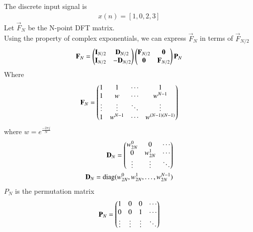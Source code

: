 \documentclass[journal,12pt,twocolumn]{IEEEtran}
\begin{document}
The discrete input signal is
\begin{align}
    x(n)=[1,0,2,3]
\end{align}
Let $\vec{F}_N$ be the N-point DFT matrix.\\
Using the property of complex exponentials, we can express $\vec{F}_N$ in terms of $\vec{F}_{N/2}$
\begin{align}
    \mathbf{F}_N=\begin{pmatrix}\mathbf{I}_{N/2} & \mathbf{D}_{N/2} \\ \mathbf{I}_{N/2} & -\mathbf{D}_{N/2}\end{pmatrix}\begin{pmatrix}\mathbf{F}_{N/2} & \mathbf{0} \\ \mathbf{0} & \mathbf{F}_{N/2}\end{pmatrix}\mathbf{P}_N
\end{align}
Where
\begin{align}
    \mathbf{F}_N=\begin{pmatrix}1 & 1 & \cdots & 1 \\ 1 & w & \cdots & w^{N-1} \\ \vdots & \vdots & \ddots & \vdots\\ 1 & w^{N-1} & \cdots & w^{(N-1)(N-1)}\end{pmatrix}
\end{align}
where $w=e^{\frac{-2\pi j}{N}}$
\begin{align}
\mathbf{D}_N=\begin{pmatrix}w_{2N}^0 & 0 & \cdots\\ 0 & w_{2N}^1 &  \cdots \\ \vdots & \vdots & \ddots \end{pmatrix}\\
\mathbf{D}_N=\text{diag}(w_{2N}^0,w_{2N}^1,\ldots,w_{2N}^{N-1})
\end{align}
$P_N$ is the permutation matrix
\begin{align}
\mathbf{P}_N=\begin{pmatrix}1&0&0&\cdots\\0&0&1&\cdots\\ \vdots & \vdots & \vdots & \ddots\end{pmatrix}
\end{align}
\end{document}
